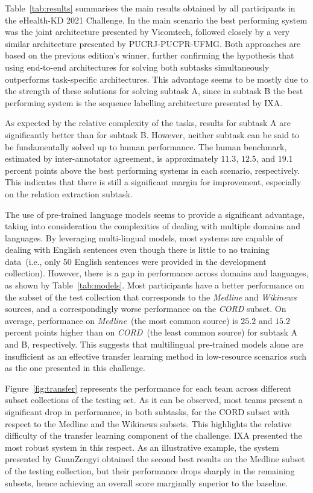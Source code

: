 \documentclass[a4paper,11pt,twocolumn,twoside]{article}
\begin{document}
Table~\ref{tab:results} summarises the main results obtained by all participants in the eHealth-KD 2021 Challenge.
In the main scenario the best performing system was the joint architecture presented by Vicomtech, followed closely by a very similar architecture presented by PUCRJ-PUCPR-UFMG.
Both approaches are based on the previous edition's winner, further confirming the hypothesis that using end-to-end architectures for solving both subtasks simultaneously outperforms task-specific architectures.
This advantage seems to be mostly due to the strength of these solutions for solving subtask A, since in subtask B the best performing system is the sequence labelling architecture presented by IXA.

As expected by the relative complexity of the tasks, results for subtask A are significantly better than for subtask B.
However, neither subtask can be said to be fundamentally solved up to human performance.
The human benchmark, estimated by inter-annotator agreement, is approximately $11.3$,
$12.5$, and $19.1$ percent points above the best performing systems in each scenario, respectively.
This indicates that there is still a significant margin for improvement, especially on the relation extraction subtask.

The use of pre-trained language models seems to provide a significant advantage, taking into consideration the complexities of dealing with multiple domains and languages.
By leveraging multi-lingual models, most systems are capable of dealing with English sentences even though there is little to no training data~(i.e., only 50 English sentences were provided in the development collection).
However, there is a gap in performance across domains and languages, as shown by Table~\ref{tab:models}.
Most participants have a better performance on the subset of the test collection that corresponds to the \textit{Medline} and \textit{Wikinews} sources, and a correspondingly worse performance on the \textit{CORD} subset.
On average, performance on \textit{Medline}~(the most common source) is $25.2$ and $15.2$ percent points higher than on \textit{CORD}~(the least common source) for subtask A and B, respectively.
This suggests that multilingual pre-trained models alone are insufficient as an effective transfer learning method in low-resource scenarios such as the one presented in this challenge.

Figure~\ref{fig:transfer} represents the performance for each team across different subset collections of the testing set. As it can be observed, most teams present a significant drop in performance, in both subtasks, for the CORD subset with respect to the Medline and the Wikinews subsets.
This highlights the relative difficulty of the transfer learning component of the challenge.
IXA presented the most robust system in this respect.
As an illustrative example, the system presented by GuanZengyi obtained the second best results on the Medline subset of the testing collection, but their performance drops sharply in the remaining subsets, hence achieving an overall score marginally superior to the baseline.
\end{document}

